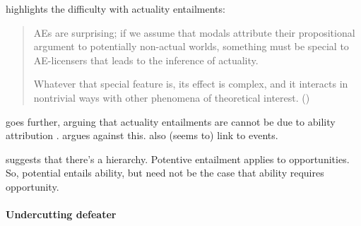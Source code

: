 \begin{note}[Entailment]
  \citeauthor{Alxatib:2019wf} highlights the difficulty with actuality entailments:

  \begin{quote}
    AEs are surprising; if we assume that modals attribute their propositional argument to potentially non-actual worlds, something must be special to AE-licensers that leads to the inference of actuality.

    Whatever that special feature is, its effect is complex, and it interacts in nontrivial ways with other phenomena of theoretical interest.\nolinebreak
    \mbox{}\hfill\mbox{(\citeyear[701]{Alxatib:2019wf})}
  \end{quote}

  {
    \color{red}
     \citeauthor{Bhatt:1999ud} goes further, arguing that actuality entailments are cannot be due to ability attribution \citeyear[\S4.2]{Bhatt:1999ud}.
  \cite{Hacquard:2006to} argues against this.
  \citeauthor{Hacquard:2006to} also (seems to) link to events.

  \textcite{Werner:2011tp} suggests that there's a hierarchy.
  Potentive entailment applies to opportunities.
  So, potential entails ability, but need not be the case that ability requires opportunity.
  }
\end{note}

\paragraph{Undercutting defeater}

